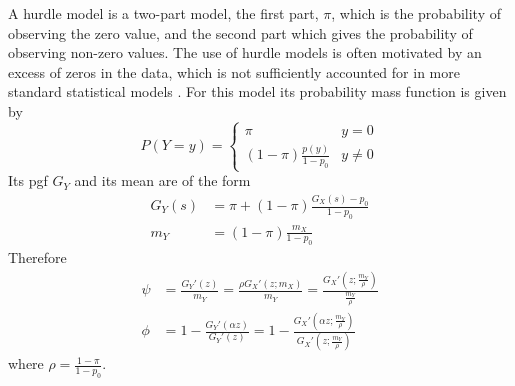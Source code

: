 \documentclass[bimj,fleqn]{w-art}
\theoremstyle{plain}
\theoremstyle{definition}
\begin{document}
A hurdle model is a two-part model, 
the first part, $\pi$, which is the probability of observing the  zero value, and the second part which gives the probability of observing non-zero values. 
The use of hurdle models is often motivated by an excess of zeros in the data, which is not sufficiently accounted for in more standard statistical models \cite{johnson2005univariate}. 
For this model its probability mass function is given by
\begin{equation*}\label{hd}
P(Y=y)= \left\{ \begin{array}{lc}
\pi & y=0 \\
(1-\pi)\frac{p(y)}{1-p_0}  & y\neq 0
\end{array}
\right.
\end{equation*}
Its pgf $G_Y$ and its mean are of the form
\begin{equation*}
\begin{split}
G_Y(s)&=\pi+(1-\pi)\frac{G_X(s)-p_0}{1-p_0}\\
m_Y&=(1-\pi)\frac{m_X}{1-p_0}
\end{split}
\end{equation*}
Therefore
\begin{equation}
\begin{split}
\psi&= \frac{G_Y'(z)}{m_Y}= \frac{\rho G_X'(z;m_X)}{ m_Y} =\frac{G_X'\left( z;\frac{m_Y}{\rho}\right) }{\frac{m_Y}{\rho}}\\
\phi&=1-\frac{G_Y'(\alpha z)}{G_Y'(z)}=1-\frac{G_X'\left( \alpha z;\frac{m_Y}{\rho}\right) }
{G_X'\left( z;\frac{m_Y}{\rho}\right) } 
\end{split}
\end{equation}
where $\rho=\frac{1-\pi}{1-p_0}$.

\end{document}
